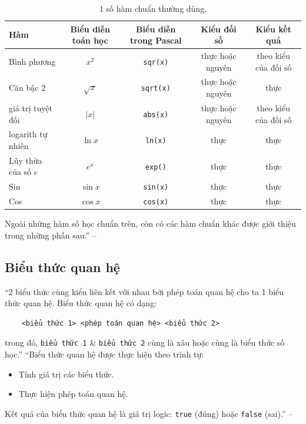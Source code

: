 \documentclass[oneside]{book}
\numberwithin{equation}{section}
\begin{document}
\begin{table}[H]
	\centering
	\begin{tabular}{|l|c|c|c|c|}
		\hline
		\textbf{Hàm} & \textbf{Biểu diễn toán học} & \textbf{Biểu diễn trong Pascal} & \textbf{Kiểu đối số} & \textbf{Kiểu kết quả} \\
		\hline
		Bình phương & $x^2$ & \texttt{sqr(x)} & thực hoặc nguyên & theo kiểu của đối số \\
		\hline
		Căn bậc 2 & $\sqrt{x}$ & \texttt{sqrt(x)} & thực hoặc nguyên & thực \\
		\hline
		giá trị tuyệt đối & $|x|$ & \texttt{abs(x)} & thực hoặc nguyên & theo kiểu của đối số \\
		\hline
		logarith tự nhiên & $\ln x$ & \texttt{ln(x)} & thực & thực \\
		\hline
		Lũy thừa của số $e$ & $e^x$ & \texttt{exp()} & thực & thực \\
		\hline
		Sin & $\sin x$ & \texttt{sin(x)} & thực & thực \\
		\hline
		Cos & $\cos x$ & \texttt{cos(x)} & thực & thực \\
		\hline
	\end{tabular}
	\caption{1 số hàm chuẩn thường dùng.}
\end{table}
Ngoài những hàm số học chuẩn trên, còn có các hàm chuẩn khác được giới thiệu trong những phần sau.'' -- \cite[p. 26]{SGK_Tin_Hoc_11}

\subsection{Biểu thức quan hệ}
``2 biểu thức cùng kiểu liên kết với nhau bởi phép toán quan hệ cho ta 1 biểu thức quan hệ. Biểu thức quan hệ có dạng:
\begin{verbatim}
	<biểu thức 1> <phép toán quan hệ> <biểu thức 2>
\end{verbatim}
trong đó, \texttt{biểu thức 1} \& \texttt{biểu thức 2} cùng là xâu hoặc cùng là biểu thức số học.'' ``Biểu thức quan hệ được thực hiện theo trình tự:
\begin{itemize}
	\item Tính giá trị các biểu thức.
	\item Thực hiện phép toán quan hệ.
\end{itemize}
Kết quả của biểu thức quan hệ là giá trị logic: \texttt{true} (đúng) hoặc \texttt{false} (sai).'' -- \cite[p. 27]{SGK_Tin_Hoc_11}
\end{document}
